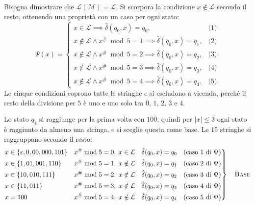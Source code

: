\documentclass[a4paper, 11pt, oneside]{book}
\theoremstyle{formale}
\begin{document}
    Bisogna dimostrare che $\mathcal{L}(\mathcal{M}) = \mathcal{L}$. Si scorpora la
    condizione $x \notin \mathcal{L}$ secondo il resto, ottenendo una propriet\`a con un
    caso per ogni stato:
    \begin{equation*}
        \Psi(x) =
        \begin{cases}
            x \in \mathcal{L} \implies \hat{\delta}(q_0, x) = q_0,
                & \text{(1)} \\
            x \notin \mathcal{L} \land x^\# \bmod 5 = 1 \implies \hat{\delta}(q_0, x) = q_1,
                & \text{(2)} \\
            x \notin \mathcal{L} \land x^\# \bmod 5 = 2 \implies \hat{\delta}(q_0, x) = q_2,
                & \text{(3)} \\
            x \notin \mathcal{L} \land x^\# \bmod 5 = 3 \implies \hat{\delta}(q_0, x) = q_3,
                & \text{(4)} \\
            x \notin \mathcal{L} \land x^\# \bmod 5 = 4 \implies \hat{\delta}(q_0, x) = q_4.
                & \text{(5)}
        \end{cases}
    \end{equation*}
    Le cinque condizioni coprono tutte le stringhe e si escludono a vicenda, perch\'e il
    resto della divisione per $5$ \`e uno e uno solo tra $0$, $1$, $2$, $3$ e $4$.

    Lo stato $q_4$ si raggiunge per la prima volta con $100$, quindi per $|x| \leq 3$ ogni
    stato \`e raggiunto da almeno una stringa, e si sceglie questa come base. Le $15$
    stringhe si raggruppano secondo il resto:
    \begin{equation*}
        \left.
        \begin{alignedat}{3}
            & x \in \{\varepsilon, 0, 00, 000, 101\} & \quad & x^\# \bmod 5 = 0,\;
                x \in \mathcal{L} & \quad & \hat{\delta}(q_0, x) = q_0
                \quad \text{(caso 1 di $\Psi$)} \\
            & x \in \{1, 01, 001, 110\} & & x^\# \bmod 5 = 1,\; x \notin \mathcal{L}
                & & \hat{\delta}(q_0, x) = q_1 \quad \text{(caso 2 di $\Psi$)} \\
            & x \in \{10, 010, 111\} & & x^\# \bmod 5 = 2,\; x \notin \mathcal{L}
                & & \hat{\delta}(q_0, x) = q_2 \quad \text{(caso 3 di $\Psi$)} \\
            & x \in \{11, 011\} & & x^\# \bmod 5 = 3,\; x \notin \mathcal{L}
                & & \hat{\delta}(q_0, x) = q_3 \quad \text{(caso 4 di $\Psi$)} \\
            & x = 100 & & x^\# \bmod 5 = 4,\; x \notin \mathcal{L}
                & & \hat{\delta}(q_0, x) = q_4 \quad \text{(caso 5 di $\Psi$)}
        \end{alignedat}
        \right\}
        \quad \text{\textsc{Base}}
    \end{equation*}
\end{document}
